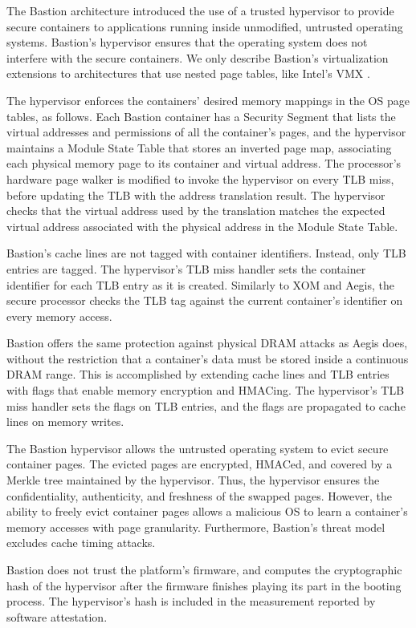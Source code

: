 \label{sec:sgx_related_bastion}

The Bastion architecture \cite{champagne2010bastion} introduced the use of a
trusted hypervisor to provide secure containers to applications running inside
unmodified, untrusted operating systems. Bastion's hypervisor ensures that the
operating system does not interfere with the secure containers. We only
describe Bastion's virtualization extensions to architectures that use nested
page tables, like Intel's VMX \cite{uhlig2005vmx}.

The hypervisor enforces the containers' desired memory mappings in the OS page
tables, as follows. Each Bastion container has a Security Segment that lists
the virtual addresses and permissions of all the container's pages, and the
hypervisor maintains a Module State Table that stores an inverted page map,
associating each physical memory page to its container and virtual address. The
processor's hardware page walker is modified to invoke the hypervisor on every
TLB miss, before updating the TLB with the address translation result. The
hypervisor checks that the virtual address used by the translation matches the
expected virtual address associated with the physical address in the Module
State Table.

Bastion's cache lines are not tagged with container identifiers. Instead, only
TLB entries are tagged. The hypervisor's TLB miss handler sets the container
identifier for each TLB entry as it is created. Similarly to XOM and Aegis, the
secure processor checks the TLB tag against the current container's identifier
on every memory access.

Bastion offers the same protection against physical DRAM attacks as Aegis does,
without the restriction that a container's data must be stored inside a
continuous DRAM range. This is accomplished by extending cache lines and TLB
entries with flags that enable memory encryption and HMACing. The hypervisor's
TLB miss handler sets the flags on TLB entries, and the flags are propagated to
cache lines on memory writes.

The Bastion hypervisor allows the untrusted operating system to evict secure
container pages. The evicted pages are encrypted, HMACed, and covered by a
Merkle tree maintained by the hypervisor. Thus, the hypervisor ensures the
confidentiality, authenticity, and freshness of the swapped pages. However, the
ability to freely evict container pages allows a malicious OS to learn a
container's memory accesses with page granularity. Furthermore, Bastion's
threat model excludes cache timing attacks.

Bastion does not trust the platform's firmware, and computes the cryptographic
hash of the hypervisor after the firmware finishes playing its part in the
booting process. The hypervisor's hash is included in the measurement reported
by software attestation.
